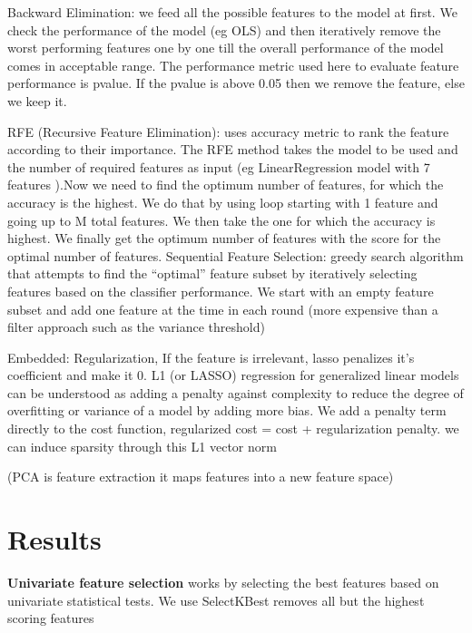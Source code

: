 \documentclass[preprint,12pt]{elsarticle}
\begin{document}
Backward Elimination: we feed all the possible features to the model at first. We check the performance of the model (eg OLS) and then iteratively remove the worst performing features one by one till the overall performance of the model comes in acceptable range. The performance metric used here to evaluate feature performance is pvalue. If the pvalue is above 0.05 then we remove the feature, else we keep it.

RFE (Recursive Feature Elimination): uses accuracy metric to rank the feature according to their importance. The RFE method takes the model to be used and the number of required features as input (eg LinearRegression model with 7 features ).Now we need to find the optimum number of features, for which the accuracy is the highest. We do that by using loop starting with 1 feature and going up to M total features. We then take the one for which the accuracy is highest. We finally get the optimum number of features with the score for the optimal number of features.
Sequential Feature Selection: greedy search algorithm that attempts to find the “optimal” feature subset by iteratively selecting features based on the classifier performance. We start with an empty feature subset and add one feature at the time in each round (more expensive than a filter approach such as the variance threshold)

Embedded: Regularization, If the feature is irrelevant, lasso penalizes it’s coefficient and make it 0. L1 (or LASSO) regression for generalized linear models can be understood as adding a penalty against complexity to reduce the degree of overfitting or variance of a model by adding more bias. We add a penalty term directly to the cost function, regularized cost = cost + regularization penalty. we can induce sparsity through this L1 vector norm


(PCA is feature extraction it maps features into a new feature space)


\section{Results}
\label{S:3}

\textbf{Univariate feature selection} works by selecting the best features based on univariate statistical tests. We use SelectKBest removes all but the highest scoring features
\end{document}
